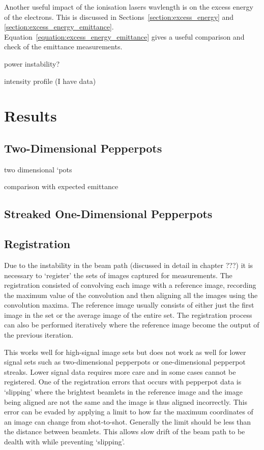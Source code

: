 Another useful impact of the ionisation lasers wavlength is on the excess energy of the electrons.
This is discussed in Sections~\ref{section:excess_energy} and \ref{section:excess_energy_emittance}.
Equation~\ref{equation:excess_energy_emittance} gives a useful comparison and check of the emittance measurements.

power instability?

intensity profile (I have data)

\section{Results}

\subsection{Two-Dimensional Pepperpots}

two dimensional `pots

comparison with expected emittance

\subsection{Streaked One-Dimensional Pepperpots}

\subsection{Registration}
Due to the instability in the beam path {\color{red}(discussed in detail in chapter ???)} it is necessary to `register' the sets of images captured for measurements.
The registration consisted of convolving each image with a reference image, recording the maximum value of the convolution and then aligning all the images using the convolution maxima.
The reference image usually consists of either just the first image in the set or the average image of the entire set.
The registration process can also be performed iteratively where the reference image become the output of the previous iteration.

This works well for high-signal image sets but does not work as well for lower signal sets such as two-dimensional pepperpots or one-dimensional pepperpot streaks.
Lower signal data requires more care and in some cases cannot be registered.
One of the registration errors that occurs with pepperpot data is `slipping' where the brightest beamlets in the reference image and the image being aligned are not the same and the image is thus aligned incorrectly.
This error can be evaded by applying a limit to how far the maximum coordinates of an image can change from shot-to-shot.
Generally the limit should be less than the distance between beamlets.
This allows slow drift of the beam path to be dealth with while preventing `slipping'.

